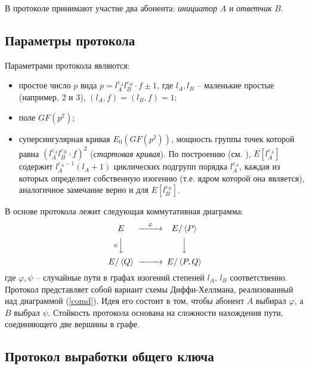 \documentclass[a4paper,12pt]{article}
\newcommand{\tr}[1]{\left\langle #1\right\rangle}
\theoremstyle{definition}
\begin{document}
В протоколе принимают участие два абонента: \emph{инициатор} $A$ и \emph{ответчик} $B$.

\subsection*{Параметры протокола}

Параметрами протокола являются:
\begin{itemize}
 \item простое число $p$ вида $ p=l_A^{e_A}l_B^{e_B}\cdot f  \pm 1$, где $l_A,l_B$ -- маленькие простые (например, 2 и 3),
$(l_A,f)=(l_B,f)=1$;
\item поле $GF(p^2)$;
\item суперсингулярная кривая $E_0(GF(p^2))$, мощность группы точек которой равна $(l_A^{e_A}l_B^{e_B}\cdot f)^2$ (\emph{стартовая кривая}). По построению (см. \cite{DF}), $E[l_A^{e_A}]$ содержит $l_A^{e_A-1}(l_A+1)$ циклических подгрупп порядка $l_A^{e_A}$, каждая из которых определяет собственную изогению (т.е. ядром которой она является), аналогичное замечание  верно и для $E[l_B^{e_B}]$.
\end{itemize}

В основе протокола лежит следующая коммутативная диаграмма:
\begin{equation}\label{comd}
\begin{CD}
 E @>\varphi >> E/\tr{P} \\
 @V\psi VV @VVV \\
 E/\tr{Q} @>>> E/\tr{P,Q}
\end{CD}
\end{equation}
где $\varphi, \psi$ -- случайные пути в графах изогений степеней $l_A$, $l_B$ соответственно. Протокол представляет собой вариант схемы Диффи-Хеллмана, реализованный над диаграммой (\ref{comd}). Идея его состоит в том, чтобы абонент $A$ выбирал $\varphi$, а $B$ выбрал $\psi$. Стойкость протокола основана на 
сложности нахождения пути, соединяющего две вершины в графе. 

\subsection*{Протокол выработки общего ключа}


\end{document}
